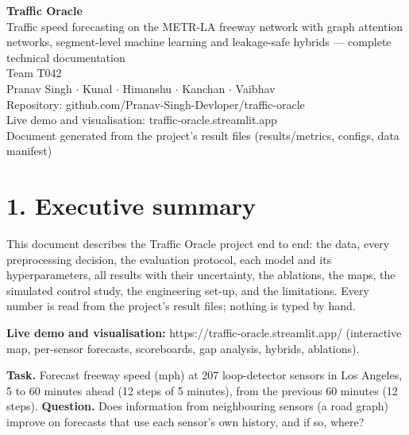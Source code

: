 \documentclass[10pt,a4paper]{article}
\begin{document}
\begin{titlepage}\centering\vspace*{3cm}
{\fontsize{40}{44}\selectfont\bfseries\color{accent} Traffic Oracle}\\[1.2cm]
{\Large Traffic speed forecasting on the METR-LA freeway network with graph attention networks, segment-level machine learning and leakage-safe hybrids --- complete technical documentation}\\[2cm]
{\large Team T042}\\[4pt]
{\large Pranav Singh \ensuremath{\cdot} Kunal \ensuremath{\cdot} Himanshu \ensuremath{\cdot} Kanchan \ensuremath{\cdot} Vaibhav}\\[4pt]
{\large Repository: github.com/\allowbreak{}Pranav-Singh-Devloper/\allowbreak{}traffic-oracle}\\[4pt]
{\large Live demo and visualisation: traffic-oracle.streamlit.app}\\[4pt]
{\large Document generated from the project's result files (results/\allowbreak{}metrics, configs, data manifest)}
\end{titlepage}
\setcounter{tocdepth}{2}\tableofcontents
\clearpage
\clearpage
\section*{1. Executive summary}
This document describes the Traffic Oracle project end to end: the data, every preprocessing decision, the evaluation protocol, each model and its hyperparameters, all results with their uncertainty, the ablations, the maps, the simulated control study, the engineering set-up, and the limitations. Every number is read from the project's result files; nothing is typed by hand.

\textbf{Live demo and visualisation:} https:/\allowbreak{}/\allowbreak{}traffic-oracle.streamlit.app/\allowbreak{} (interactive map, per-sensor forecasts, scoreboards, gap analysis, hybrids, ablations).

\textbf{Task.} Forecast freeway speed (mph) at 207 loop-detector sensors in Los Angeles, 5 to 60 minutes ahead (12 steps of 5 minutes), from the previous 60 minutes (12 steps). \textbf{Question.} Does information from neighbouring sensors (a road graph) improve on forecasts that use each sensor's own history, and if so, where?
\end{document}
